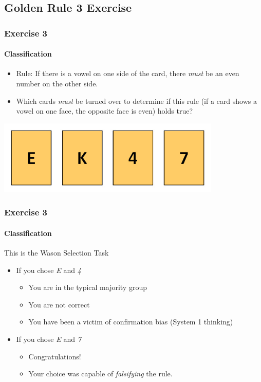 %

\subsection{Golden Rule 3 Exercise}
\begin{frame}
  \frametitle{Exercise 3}
  \framesubtitle{Classification}
  \begin{itemize}
    \item Rule: If there is a vowel on one side of the card, there \textit{must} be an even number on the other side.
    \item Which cards \textit{must} be turned over to determine if this rule (if a card shows a vowel on one face, the opposite face is even) holds true?
  \end{itemize}
  \includegraphics[width=0.8\textwidth]{images/wason}
\end{frame}

\begin{frame}
  \frametitle{Exercise 3}
  \framesubtitle{Classification}
  This is the Wason Selection Task
  \begin{itemize}
    \item<1-> If you chose \emph{E} and \emph{4}
    \begin{itemize}
      \item<2-> You are in the typical majority group
      \item<2-> You are not correct
      \item<2-> You have been a victim of confirmation bias (System 1 thinking)
    \end{itemize}
    \item<3-> If you chose \emph{E} and \emph{7}
    \begin{itemize}
      \item<4-> Congratulations!
      \item<4-> Your choice was capable of \textit{falsifying} the rule.
    \end{itemize}
  \end{itemize}
\end{frame}


